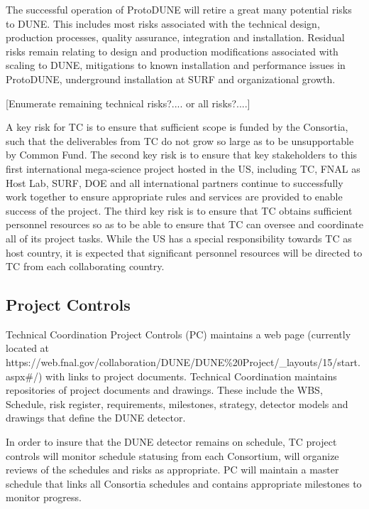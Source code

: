 The successful operation of ProtoDUNE will retire a great many
potential risks to DUNE. This includes most risks associated with the
technical design, production processes, quality assurance, integration
and installation. Residual risks remain relating to design and
production modifications associated with scaling to DUNE, mitigations
to known installation and performance issues in ProtoDUNE, underground
installation at SURF and organizational growth.

[Enumerate remaining technical risks?.... or all risks?....]

A key risk for TC is to ensure that sufficient scope is funded by the
Consortia, such that the deliverables from TC do not grow so large as
to be unsupportable by Common Fund. The second key risk is to ensure
that key stakeholders to this first international mega-science project
hosted in the US, including TC, FNAL as Host Lab, SURF, DOE and all
international partners continue to successfully work together to
ensure appropriate rules and services are provided to enable success
of the project.  The third key risk is to ensure that TC obtains
sufficient personnel resources so as to be able to ensure that TC can
oversee and coordinate all of its project tasks.  While the US has a
special responsibility towards TC as host country, it is expected that
significant personnel resources will be directed to TC from each
collaborating country.



\subsection{Project Controls}
\label{sec:fdsp-coord-controls}

Technical Coordination Project Controls (PC) maintains a web page
(currently located at
{https://web.fnal.gov/collaboration/DUNE/DUNE\%20Project/\_layouts/15/start.aspx\#/})
with links to project documents. Technical Coordination maintains
repositories of project documents and drawings. These include the WBS,
Schedule, risk register, requirements, milestones, strategy, detector
models and drawings that define the DUNE detector.

In order to insure that the DUNE detector remains on schedule, TC
project controls will monitor schedule statusing from each Consortium,
will organize reviews of the schedules and risks as appropriate. PC
will maintain a master schedule that links all Consortia schedules and
contains appropriate milestones to monitor progress.

